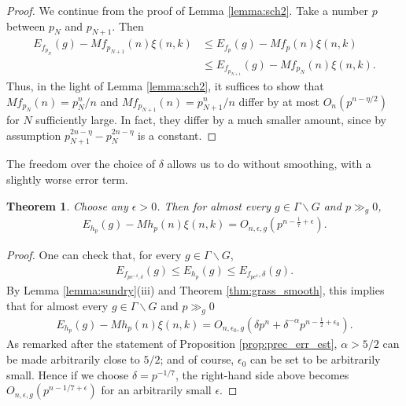 \documentclass[11pt]{amsart}
\newtheorem{theorem}{Theorem}
\numberwithin{theorem}{section}
\numberwithin{equation}{section}
\theoremstyle{remark}
\theoremstyle{definition}
\newcommand{\G}{\Gamma}
\begin{document}
\begin{proof}
We continue from the proof of Lemma \ref{lemma:sch2}. Take a number $p$ between $p_N$ and $p_{N+1}$. Then
\begin{align*}
E_{f_{p_N}}(g) - Mf_{p_{N+1}}(n)\xi(n,k) &\leq E_{f_{p}}(g) - Mf_{p}(n)\xi(n,k) \\ &\leq E_{f_{p_{N+1}}}(g) - Mf_{p_N}(n)\xi(n,k).
\end{align*}
Thus, in the light of Lemma \ref{lemma:sch2}, it suffices to show that $Mf_{p_N}(n) = p_N^n/n$ and $Mf_{p_{N+1}}(n)= p_{N+1}^n/n$ differ by at most $O_n(p^{n-\eta/2})$ for $N$ sufficiently large. In fact, they differ by a much smaller amount, since by assumption $p_{N+1}^{2n-\eta}-p_N^{2n-\eta}$ is a constant.
\end{proof}


The freedom over the choice of $\delta$ allows us to do without smoothing, with a slightly worse error term.

\begin{theorem} \label{thm:grass}
Choose any $\epsilon>0$. Then for almost every $g \in \Gamma\backslash G$ and $p \gg_{g} 0$,
\begin{align*}
E_{h_p}(g) - Mh_p(n)\xi(n,k) = O_{n,\epsilon,g}(p^{n-\frac{1}{7}+\epsilon}).
\end{align*}
\end{theorem}
\begin{proof}
One can check that, for every $g \in \G\backslash G$,
\begin{align*}
E_{f_{pe^{-\delta},\delta}}(g) \leq E_{h_p}(g) \leq E_{f_{pe^\delta},\delta}(g).
\end{align*}
By Lemma \ref{lemma:sundry}(iii) and Theorem \ref{thm:grass_smooth}, this implies that for almost every $g \in \G\backslash G$ and $p \gg_{g} 0$
\begin{align*}
E_{h_p}(g) - Mh_p(n)\xi(n,k) = O_{n,\epsilon_0,g}\left(\delta p^n + \delta^{-\alpha}p^{n-\frac{1}{2}+\epsilon_0} \right).
\end{align*}
As remarked after the statement of Proposition \ref{prop:prec_err_est}, $\alpha > 5/2$ can be made arbitrarily close to $5/2$; and of course, $\epsilon_0$ can be set to be arbitrarily small. Hence if we choose $\delta = p^{-1/7}$, the right-hand side above becomes $O_{n,\epsilon,g}(p^{n-1/7+\epsilon})$ for an arbitrarily small $\epsilon$.
\end{proof}
\end{document}
